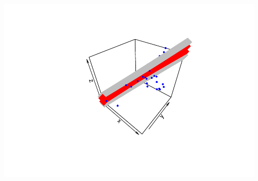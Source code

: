 \documentclass[]{article}
\begin{document}
\includegraphics{Izvjestaj_files/figure-latex/unnamed-chunk-40-1.pdf}
\end{document}
